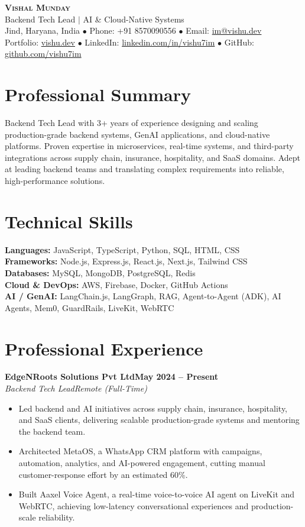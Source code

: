 \documentclass[10pt,a4paper]{article}
\newcommand{\role}[4]{%
  \textbf{#1}\hfill\textbf{#3}\\
  \textit{#2}\hfill\textit{#4}\vspace{2pt}%
}
\begin{document}
\begin{center}
  {\LARGE \scshape \textbf{Vishal Munday}}\\[3pt]
  {\normalsize Backend Tech Lead $|$ AI \& Cloud-Native Systems}\\[4pt]
  \small
  Jind, Haryana, India $\bullet$ Phone: +91 8570090556 $\bullet$
  Email: \href{mailto:im@vishu.dev}{im@vishu.dev}\\
  Portfolio: \href{https://vishu.dev}{vishu.dev} $\bullet$
  LinkedIn: \href{https://linkedin.com/in/vishu7im/}{linkedin.com/in/vishu7im} $\bullet$
  GitHub: \href{https://github.com/vishu7im}{github.com/vishu7im}
\end{center}

\section{Professional Summary}
Backend Tech Lead with 3+ years of experience designing and scaling production-grade backend systems, GenAI applications, and cloud-native platforms. Proven expertise in microservices, real-time systems, and third-party integrations across supply chain, insurance, hospitality, and SaaS domains. Adept at leading backend teams and translating complex requirements into reliable, high-performance solutions.

\section{Technical Skills}
\textbf{Languages:} JavaScript, TypeScript, Python, SQL, HTML, CSS\\
\textbf{Frameworks:} Node.js, Express.js, React.js, Next.js, Tailwind CSS\\
\textbf{Databases:} MySQL, MongoDB, PostgreSQL, Redis\\
\textbf{Cloud \& DevOps:} AWS, Firebase, Docker, GitHub Actions\\
\textbf{AI / GenAI:} LangChain.js, LangGraph, RAG, Agent-to-Agent (ADK), AI Agents, Mem0, GuardRails, LiveKit, WebRTC

\section{Professional Experience}
\role{EdgeNRoots Solutions Pvt Ltd}{Backend Tech Lead}{May 2024 -- Present}{Remote (Full-Time)}
\begin{itemize}
  \item Led backend and AI initiatives across supply chain, insurance, hospitality, and SaaS clients, delivering scalable production-grade systems and mentoring the backend team.
  \item Architected MetaOS, a WhatsApp CRM platform with campaigns, automation, analytics, and AI-powered engagement, cutting manual customer-response effort by an estimated 60\%.
  \item Built Aaxel Voice Agent, a real-time voice-to-voice AI agent on LiveKit and WebRTC, achieving low-latency conversational experiences and production-scale reliability.
\end{itemize}
\end{document}
